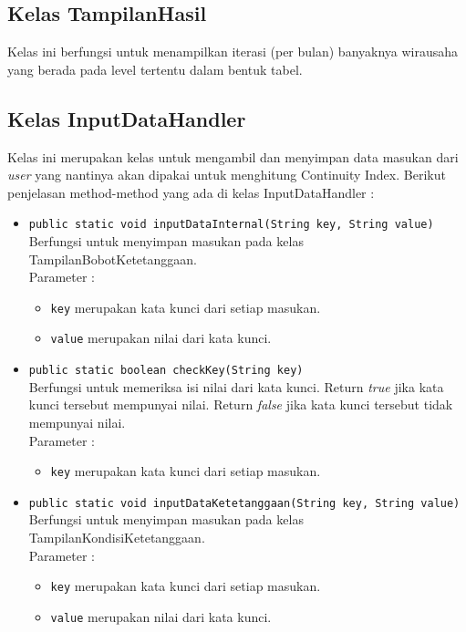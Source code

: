 \subsection{Kelas TampilanHasil}
Kelas ini berfungsi untuk menampilkan iterasi (per bulan) banyaknya wirausaha yang berada pada level tertentu dalam bentuk tabel.

\subsection{Kelas InputDataHandler}
Kelas ini merupakan kelas untuk mengambil dan menyimpan data masukan dari \textit{user} yang nantinya akan dipakai untuk menghitung Continuity Index.
Berikut penjelasan method-method yang ada di kelas InputDataHandler :
	\begin{itemize}
		\item \texttt{public static void inputDataInternal(String key, String value)}\\
		Berfungsi untuk menyimpan masukan pada kelas TampilanBobotKetetanggaan.\\
		Parameter :
		\begin{itemize}
			\item \texttt{key} merupakan kata kunci dari setiap masukan.
			\item \texttt{value} merupakan nilai dari kata kunci.
		\end{itemize}
		
		\item \texttt{public static boolean checkKey(String key)}\\
		Berfungsi untuk memeriksa isi nilai dari kata kunci. Return \textit{true} jika kata kunci tersebut mempunyai nilai. Return \textit{false} jika kata kunci tersebut tidak mempunyai nilai.\\
		Parameter :
		\begin{itemize}
			\item \texttt{key} merupakan kata kunci dari setiap masukan.
		\end{itemize}
		
		\item \texttt{public static void inputDataKetetanggaan(String key, String value)}\\
		Berfungsi untuk menyimpan masukan pada kelas TampilanKondisiKetetanggaan.\\
		Parameter :
		\begin{itemize}
			\item \texttt{key} merupakan kata kunci dari setiap masukan.
			\item \texttt{value} merupakan nilai dari kata kunci.
		\end{itemize}
		

\end{itemize}
